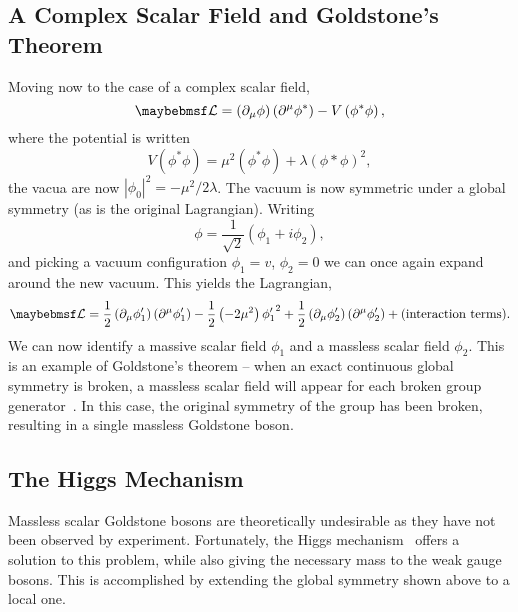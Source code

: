 \subsection{A Complex Scalar Field and Goldstone's Theorem}
\label{sec:sm_goldstone}
Moving now to the case of a complex scalar field,
\begin{equation*}
\lagrangiand = \left(\partial_{\mu}\phi\right)\left(\partial^{\mu}\phi^*\right)
- V\left(\phi^*\phi\right),
\end{equation*}
where the potential is written
\begin{equation*}
V\left(\phi^*\phi\right) = \mu^2\left(\phi^*\phi\right) +
\lambda\left(\phi*\phi\right)^2,
\end{equation*}
the vacua are now $\left|\phi_0\right|^2 = -\mu^2/2\lambda$. The vacuum is now
symmetric under a global \Uone symmetry (as is the original Lagrangian). Writing
\begin{equation*}
\phi = \frac{1}{\sqrt{2}}\left(\phi_1 + i\phi_2\right),
\end{equation*}
and picking a vacuum configuration $\phi_1 = v$, $\phi_2 = 0$ we can once again
expand around the new vacuum. This yields the Lagrangian,
\begin{equation*}
  \lagrangiand =
  \frac{1}{2}\left(\partial_{\mu}\phi'_1\right)\left(\partial^{\mu}\phi'_1\right)
  -\frac{1}{2}\left(-2\mu^2\right){\phi'_1}^2 +
  \frac{1}{2}\left(\partial_{\mu}\phi'_2\right)\left(\partial^{\mu}\phi'_2\right)
  + \textrm{(interaction terms)}.
\end{equation*}
We can now identify a massive scalar field $\phi_1$ and a massless scalar field
$\phi_2$. This is an example of Goldstone's theorem -- when an exact continuous
global symmetry is broken, a massless scalar field will appear for each broken
group generator~\cite{nambu,goldstone}. In this case, the original \Uone
symmetry of the group has been broken, resulting in a single massless Goldstone
boson.

\subsection{The Higgs Mechanism}\label{sec:sm_higgs}
Massless scalar Goldstone bosons are theoretically undesirable as they have not
been observed by experiment. Fortunately, the Higgs
mechanism~\cite{higgs,kibble,englert} offers a solution to this problem, while
also giving the necessary mass to the weak gauge bosons. This is accomplished by
extending the global symmetry shown above to a local one.

